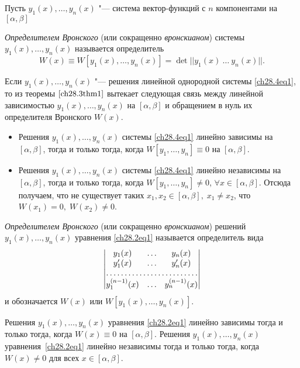 Пусть $y_1(x), \ldots, y_n(x)$ "--- система вектор-функций с $n$ компонентами на $[\alpha, \beta]$
\begin{defn}
\textit{Определителем Вронского} (или сокращенно \textit{вронскианом}) системы $y_1(x), \ldots, y_n(x)$ называется определитель
$$
W(x) \equiv W[y_1(x), \ldots, y_n(x)] = \det ||y_1(x)\ \ldots\ y_n(x)||.
$$

Если $y_1(x), \ldots, y_n(x)$ "--- решения линейной однородной системы \eqref{ch28.4eq1}, то из теоремы $\ref{ch28.3thm1}$ вытекает следующая связь между линейной зависимостью $y_1(x), \ldots, y_n(x)$ на $[\alpha, \beta]$ и обращением в нуль их определителя Вронского $W(x)$.

\begin{itemize}
\item
Решения $y_1(x), \ldots, y_n(x)$ системы \eqref{ch28.4eq1} линейно зависимы на $[\alpha, \beta]$, тогда и только тогда, когда $W[y_1, \ldots, y_n] \equiv 0$ на $[\alpha, \beta]$.
\item
Решения $y_1(x), \ldots, y_n(x)$ системы \eqref{ch28.4eq1} линейно независимы на $[\alpha, \beta]$, тогда и только тогда, когда $W[y_1, \ldots, y_n] \not = 0$, $\forall x \in [\alpha, \beta]$. Отсюда получаем, что не существует таких $x_1, x_2 \in [\alpha, \beta], \; x_1 \not= x_2$, что $W(x_1) = 0, \; W(x_2) \not= 0$. 
\end{itemize}
\end{defn}

\begin{defn}
\textit{Определителем Вронского} (или сокращенно \textit{вронскианом}) решений $y_1(x), \ldots, y_n(x)$ уравнения \eqref{ch28.2eq1} называется определитель вида
\begin{equation}
\begin{vmatrix}
y_1(x) & \ldots & y_n(x) \\
y'_1(x) & \ldots & y'_n(x) \\
\hdotsfor{3} \\
y^{(n - 1)}_1(x) & \ldots & y^{(n - 1)}_n(x)
\end{vmatrix}
\end{equation}
и обозначается $W(x)$ или $W[y_1(x), \ldots, y_n(x)]$.
\end{defn}

\begin{thm} \label{ch28.3thm3}
Решения $y_1(x), \ldots, y_n(x)$ уравнения \eqref{ch28.2eq1} линейно зависимы тогда и только тогда, когда $W(x) \equiv 0$ на $[\alpha, \beta]$. Решения $y_1(x), \ldots, y_n(x)$ уравнения~\eqref{ch28.2eq1} линейно независимы тогда и только тогда, когда $W(x) \not= 0$ для всех $x \in [\alpha, \beta]$.
\end{thm}

